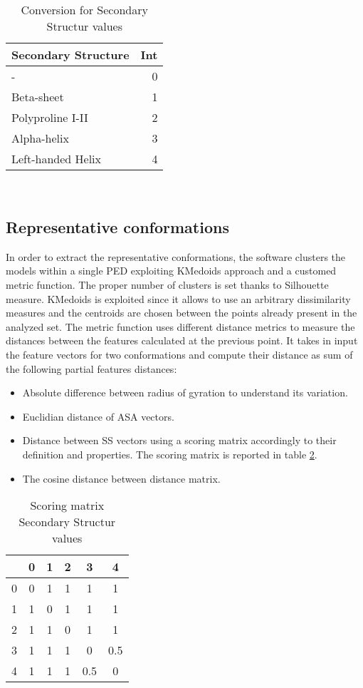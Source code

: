 \begin{table}[H]
\begin{center}
\begin{tabular}{lr}
\textbf{Secondary Structure} & \textbf{Int}\\
\hline
- & 0\\
\hline
Beta-sheet & 1\\
\hline
Polyproline I-II & 2\\
\hline
Alpha-helix & 3\\
\hline
Left-handed Helix & 4\\
\end{tabular}
\end{center}
\caption{Conversion for Secondary Structur values}~\label{tab:ss}
\end{table}



\subsection{Representative conformations} 
In order to extract the representative conformations, the software clusters the models within a single PED exploiting KMedoids approach and a customed metric function. The proper number of clusters is set thanks to Silhouette measure. 
KMedoids is exploited since it allows to use an arbitrary dissimilarity measures and the centroids are chosen between the points already present in the analyzed set. 
The metric function uses different distance metrics to measure the distances between the features calculated at the previous point. It takes in input the feature vectors for two conformations and compute their distance as sum of the following partial features distances:
\begin{itemize}
\item Absolute difference between radius of gyration to understand its variation.
\item Euclidian distance of ASA vectors.
\item Distance between SS vectors using a scoring matrix accordingly to their definition and properties. The scoring matrix is reported in table \ref{tab:score}. 
\item The cosine distance between distance matrix. 
\end{itemize}

\begin{table}[H]
\begin{center}
\begin{tabular}{c|ccccc}
& 0 & 1 & 2 & 3 & 4 \\
\hline
0 & 0 & 1 & 1 & 1 & 1\\
1 & 1 & 0 & 1 & 1 & 1\\
2 & 1 & 1 & 0 & 1 & 1\\
3 & 1 & 1 & 1 & 0 & 0.5\\
4 & 1 & 1 & 1 & 0.5 & 0\\
\end{tabular}
\end{center}
\caption{Scoring matrix Secondary Structur values}~\label{tab:score}
\end{table}


